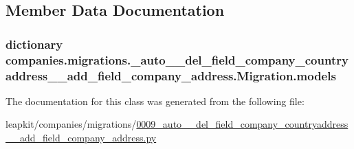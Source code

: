 \subsection{Member Data Documentation}
\hypertarget{classcompanies_1_1migrations_1_10009__auto____del__field__company__countryaddress____add__field__company__address_1_1_migration_a692ee66cd1e41286a779118f43520c18}{
\subsubsection[{models}]{\setlength{\rightskip}{0pt plus 5cm}dictionary companies.\-migrations.\-\_\-auto\-\_\-\-\_\-del\-\_\-field\-\_\-company\-\_\-countryaddress\-\_\-\-\_\-add\-\_\-field\-\_\-company\-\_\-address.\-Migration.\-models\hspace{0.3cm}{\ttfamily [static]}}}\label{classcompanies_1_1migrations_1_10009__auto____del__field__company__countryaddress____add__field__company__address_1_1_migration_a692ee66cd1e41286a779118f43520c18}


The documentation for this class was generated from the following file\-:\begin{DoxyCompactItemize}
\item 
leapkit/companies/migrations/\hyperlink{0009__auto____del__field__company__countryaddress____add__field__company__address_8py}{0009\-\_\-auto\-\_\-\-\_\-del\-\_\-field\-\_\-company\-\_\-countryaddress\-\_\-\-\_\-add\-\_\-field\-\_\-company\-\_\-address.\-py}\end{DoxyCompactItemize}
